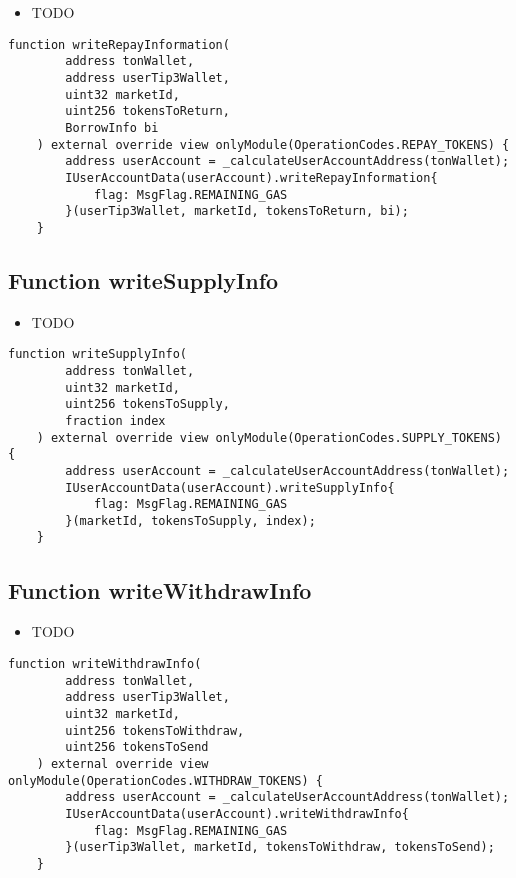 \noindent\begin{itemize}
\item TODO
\end{itemize}

\begin{lstlisting}[firstnumber=300]
    function writeRepayInformation(
        address tonWallet, 
        address userTip3Wallet, 
        uint32 marketId,
        uint256 tokensToReturn, 
        BorrowInfo bi
    ) external override view onlyModule(OperationCodes.REPAY_TOKENS) {
        address userAccount = _calculateUserAccountAddress(tonWallet);
        IUserAccountData(userAccount).writeRepayInformation{
            flag: MsgFlag.REMAINING_GAS
        }(userTip3Wallet, marketId, tokensToReturn, bi);
    }
\end{lstlisting}

\subsection{Function writeSupplyInfo}

\noindent\begin{itemize}
\item TODO
\end{itemize}

\begin{lstlisting}[firstnumber=151]
    function writeSupplyInfo(
        address tonWallet,
        uint32 marketId, 
        uint256 tokensToSupply, 
        fraction index
    ) external override view onlyModule(OperationCodes.SUPPLY_TOKENS) {
        address userAccount = _calculateUserAccountAddress(tonWallet);
        IUserAccountData(userAccount).writeSupplyInfo{
            flag: MsgFlag.REMAINING_GAS
        }(marketId, tokensToSupply, index);
    }
\end{lstlisting}

\subsection{Function writeWithdrawInfo}

\noindent\begin{itemize}
\item TODO
\end{itemize}

\begin{lstlisting}[firstnumber=207]
    function writeWithdrawInfo(
        address tonWallet, 
        address userTip3Wallet, 
        uint32 marketId, 
        uint256 tokensToWithdraw, 
        uint256 tokensToSend
    ) external override view onlyModule(OperationCodes.WITHDRAW_TOKENS) {
        address userAccount = _calculateUserAccountAddress(tonWallet); 
        IUserAccountData(userAccount).writeWithdrawInfo{
            flag: MsgFlag.REMAINING_GAS
        }(userTip3Wallet, marketId, tokensToWithdraw, tokensToSend);
    }
\end{lstlisting}

